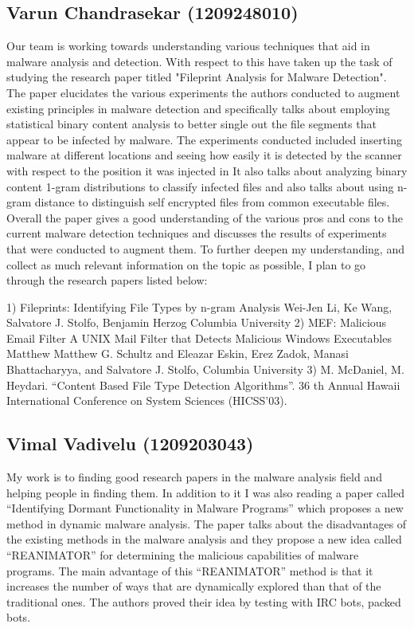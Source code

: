 \documentclass[16pt]{article}
\begin{document}
		\subsection{Varun Chandrasekar (1209248010)}
		Our team is working towards understanding various techniques that aid in malware analysis and detection. With respect to this have taken up the task of studying the research paper titled "Fileprint Analysis for Malware Detection".   The paper elucidates the various experiments the authors conducted to augment existing principles in malware detection and specifically talks about employing statistical binary content analysis to better single out the file segments that appear to be infected by malware. The experiments conducted included inserting malware at different locations and seeing how easily it is detected by the scanner with respect to the position it was injected in It also talks about analyzing binary content 1-gram distributions to classify infected files and also talks about using n-gram distance to distinguish self encrypted files from common executable files.\\
		
		Overall the paper gives a good understanding of the various pros and cons to the current malware detection techniques and discusses the results of experiments that were conducted to augment them. To further deepen my understanding, and collect as much relevant information on the topic as possible, I plan to go through the research papers listed below:
		
		1) Fileprints: Identifying File Types by n-gram Analysis
		Wei-Jen Li, Ke Wang, Salvatore J. Stolfo, Benjamin Herzog Columbia University
		2) MEF: Malicious Email Filter A UNIX Mail Filter that Detects Malicious Windows Executables Matthew Matthew G. Schultz and Eleazar Eskin, Erez Zadok, Manasi Bhattacharyya, and Salvatore J. Stolfo, Columbia University
		3) M. McDaniel, M. Heydari. “Content Based File Type Detection Algorithms”. 36 th Annual Hawaii International Conference on System Sciences (HICSS’03).
		\subsection{Vimal Vadivelu (1209203043)}
		My work is to finding good research papers in the malware analysis field and helping people in finding them. In addition to it I was also reading a paper called “Identifying Dormant Functionality in Malware Programs” which proposes a new method in dynamic malware analysis. The paper talks about the disadvantages of the existing methods in the malware analysis and they propose a new idea called “REANIMATOR” for determining the malicious capabilities of malware programs. The main advantage of this “REANIMATOR” method is that it increases the number of ways that are dynamically explored than that of the traditional ones. The authors proved their idea by testing with IRC bots, packed bots. \\
		
\end{document}
